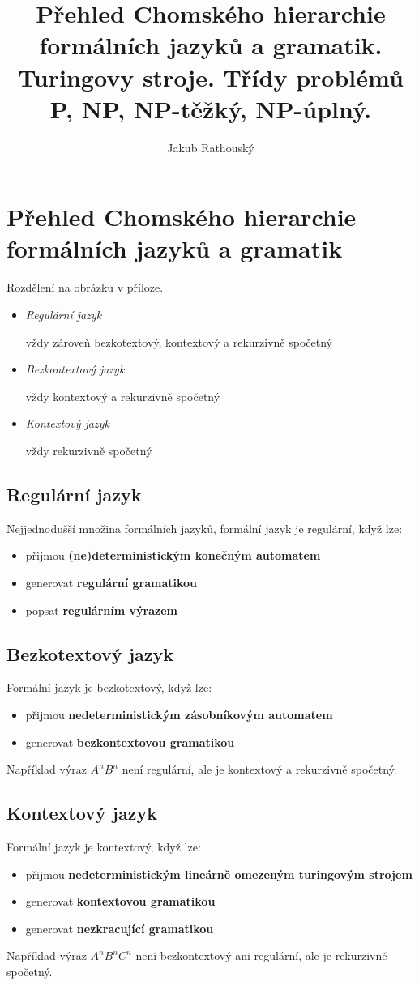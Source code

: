 \documentclass{szzclass}
\title{Přehled Chomského hierarchie formálních jazyků a gramatik. Turingovy stroje. Třídy problémů P, NP, NP-těžký, NP-úplný.}
\author{Jakub Rathouský}
\begin{document}
\maketitle
\tableofcontents
\newpage

\section{Přehled Chomského hierarchie formálních ja\-zyků a gramatik}

Rozdělení na obrázku v příloze.

\begin{itemize}
    \item \textit{Regulární jazyk} 
     
    vždy zároveň bezkotextový, kontextový a rekurzivně spočetný
    \item \textit{Bezkontextový jazyk}
    
    vždy kontextový a rekurzivně spočetný
    \item \textit{Kontextový jazyk}
     
    vždy rekurzivně spočetný
\end{itemize}

\subsection{Regulární jazyk}
Nejjednodušší množina formálních jazyků, formální jazyk je regulární, když lze:
\begin{itemize}
	\item přijmou \textbf{(ne)deterministickým konečným automatem}
	\item generovat \textbf{regulární gramatikou}
	\item popsat \textbf{regulárním výrazem}
\end{itemize}

\subsection{Bezkotextový jazyk}
Formální jazyk je bezkotextový, když lze:
\begin{itemize}
	\item přijmou \textbf{nedeterministickým zásobníkovým automatem}
	\item generovat \textbf{bezkontextovou gramatikou}
\end{itemize}
Například výraz $A^nB^n$ není regulární, ale je kontextový a rekurzivně spočetný.

\subsection{Kontextový jazyk}
Formální jazyk je kontextový, když lze:
\begin{itemize}
	\item přijmou \textbf{nedeterministickým lineárně omezeným turingovým strojem}
	\item generovat \textbf{kontextovou gramatikou}
	\item generovat \textbf{nezkracující gramatikou}
\end{itemize}
Například výraz $A^nB^nC^n$ není bezkontextový ani regulární, ale je rekurzivně spočetný. 
\end{document}
